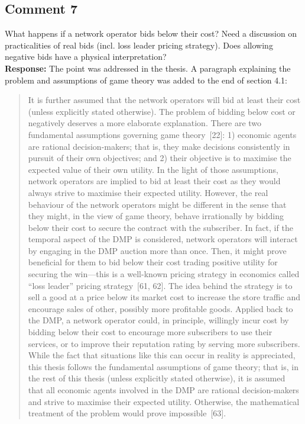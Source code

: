 \documentclass[10pt,a4paper,notitlepage]{article}
\numberwithin{equation}{section}
\begin{document}
\subsection{Comment 7}
What happens if a network operator bids below their cost? Need a discussion on practicalities of real bids (incl. loss leader pricing strategy). Does allowing negative bids have a physical interpretation?\\[-2ex]

\textbf{Response:}
The point was addressed in the thesis. A paragraph explaining the problem and assumptions of game theory was added to the end of section 4.1:
\begin{quote}
It is further assumed that the network operators will bid at least their cost (unless explicitly stated otherwise). The problem of bidding below cost or negatively deserves a more elaborate explanation. There are two fundamental assumptions governing game theory~[22]: 1) economic agents are rational decision-makers; that is, they make decisions consistently in pursuit of their own objectives; and 2) their objective is to maximise the expected value of their own utility. In the light of those assumptions, network operators are implied to bid at least their cost as they would always strive to maximise their expected utility. However, the real behaviour of the network operators might be different in the sense that they might, in the view of game theory, behave irrationally by bidding below their cost to secure the contract with the subscriber. In fact, if the temporal aspect of the DMP is considered, network operators will interact by engaging in the DMP auction more than once. Then, it might prove beneficial for them to bid below their cost trading positive utility for securing the win---this is a well-known pricing strategy in economics called ``loss leader'' pricing strategy~[61, 62]. The idea behind the strategy is to sell a good at a price below its market cost to increase the store traffic and encourage sales of other, possibly more profitable goods. Applied back to the DMP, a network operator could, in principle, willingly incur cost by bidding below their cost to encourage more subscribers to use their services, or to improve their reputation rating by serving more subscribers. While the fact that situations like this can occur in reality is appreciated, this thesis follows the fundamental assumptions of game theory; that is, in the rest of this thesis (unless explicitly stated otherwise), it is assumed that all economic agents involved in the DMP are rational decision-makers and strive to maximise their expected utility. Otherwise, the mathematical treatment of the problem would prove impossible~[63].
\end{quote}
\end{document}
